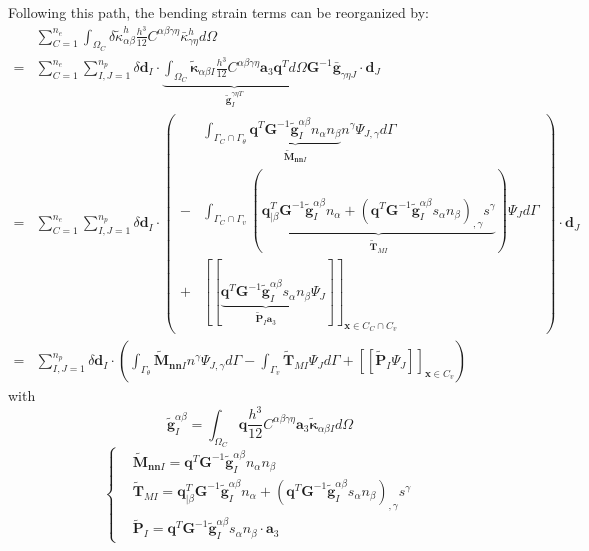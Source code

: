 Following this path, the bending strain terms can be reorganized by:
\begin{equation}
\begin{split}
&\sum_{C=1}^{n_e}\int_{\Omega_C} \delta \tilde \kappa_{\alpha\beta}^h \frac{h^3}{12}C^{\alpha\beta\gamma\eta}\bar \kappa^h_{\gamma\eta} d\Omega \\
        =&\sum_{C=1}^{n_e}\sum_{I,J=1}^{n_p}\delta \boldsymbol d_I \cdot \underbrace{\int_{\Omega_C} \tilde{\boldsymbol \kappa}_{\alpha\beta I} \frac{h^3}{12}C^{\alpha\beta\gamma\eta} \boldsymbol a_3 \boldsymbol q^T d\Omega}_{\tilde{\boldsymbol g}^{\gamma\eta T}_I} \boldsymbol G^{-1} \bar{\boldsymbol g}_{\gamma\eta J} \cdot \boldsymbol d_J \\
        =&\sum_{C=1}^{n_e}\sum_{I,J=1}^{n_p}\delta \boldsymbol d_I \cdot \left (
        \begin{split}
                &\int_{\Gamma_C\cap\Gamma_\theta} \underbrace{\boldsymbol q^T \boldsymbol G^{-1}\tilde{\boldsymbol g}^{\alpha\beta}_I n_\alpha n_\beta}_{\tilde{\boldsymbol M}_{\boldsymbol{nn} I}} n^\gamma\Psi_{J,\gamma} d\Gamma \\
                - &\int_{\Gamma_C\cap\Gamma_v} (\underbrace{\boldsymbol q^T_{\vert \beta} \boldsymbol G^{-1}\tilde{\boldsymbol g}^{\alpha\beta}_I n_\alpha + (\boldsymbol q^T \boldsymbol G^{-1}\tilde{\boldsymbol g}^{\alpha\beta}_I s_\alpha n_\beta)_{,\gamma}s^\gamma}_{\tilde{\boldsymbol T}_{M I}}) \Psi_J d\Gamma \\
                + &[[\underbrace{\boldsymbol q^T \boldsymbol G^{-1}\tilde{\boldsymbol g}^{\alpha\beta}_I s_\alpha n_\beta}_{\tilde{\boldsymbol P}_I \boldsymbol a_3} \Psi_J ]]_{\boldsymbol x\in C_C\cap C_v}
        \end{split}
       \right ) \cdot \boldsymbol d_J \\
       =&\sum_{I,J=1}^{n_p}\delta \boldsymbol d_I \cdot (
       \int_{\Gamma_\theta} \tilde{\boldsymbol M}_{\boldsymbol{nn} I} n^\gamma\Psi_{J,\gamma} d\Gamma
        - \int_{\Gamma_v} \tilde{\boldsymbol T}_{M I} \Psi_J d\Gamma
        + [[\tilde{\boldsymbol P}_I \Psi_J ]]_{\boldsymbol x\in C_v})
\end{split}
\end{equation}
with
\begin{equation}
\tilde{\boldsymbol g}^{\alpha\beta}_I = \int_{\Omega_C} \boldsymbol q \frac{h^3}{12}C^{\alpha\beta\gamma\eta} \boldsymbol a_3 \tilde{\boldsymbol \kappa}_{\alpha\beta I}d\Omega
\end{equation}
\begin{equation}
\left \{
\begin{split}
&\tilde{\boldsymbol M}_{\boldsymbol{nn} I} = \boldsymbol q^T \boldsymbol G^{-1}\tilde{\boldsymbol g}^{\alpha\beta}_I n_\alpha n_\beta \\
&\tilde{\boldsymbol T}_{M I} = \boldsymbol q^T_{\vert \beta} \boldsymbol G^{-1}\tilde{\boldsymbol g}^{\alpha\beta}_I n_\alpha + (\boldsymbol q^T \boldsymbol G^{-1}\tilde{\boldsymbol g}^{\alpha\beta}_I s_\alpha n_\beta)_{,\gamma}s^\gamma \\
&\tilde{\boldsymbol P}_I = \boldsymbol q^T \boldsymbol G^{-1}\tilde{\boldsymbol g}^{\alpha\beta}_I s_\alpha n_\beta \cdot \boldsymbol a_3
\end{split}
\right .
\end{equation}
